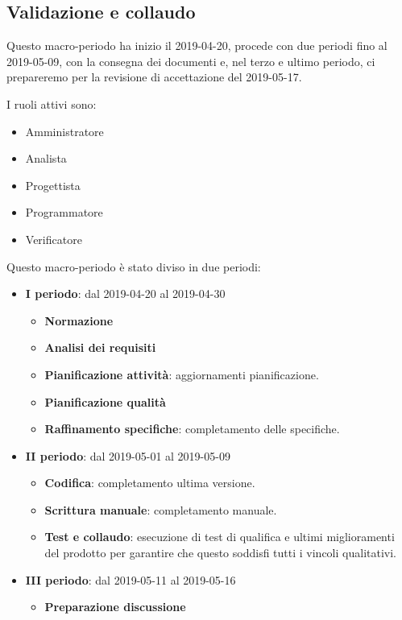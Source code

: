         \subsection{Validazione e collaudo}\label{PianificazineValidazione}
		Questo macro-periodo ha inizio il 2019-04-20, procede con due periodi fino al 2019-05-09, con la consegna dei documenti e, nel terzo e ultimo periodo,
		ci prepareremo per la revisione di accettazione del 2019-05-17.

        I ruoli attivi sono:
        \begin{itemize}
            \item Amministratore
            \item Analista
            \item Progettista
            \item Programmatore
            \item Verificatore
		\end{itemize}

        Questo macro-periodo è stato diviso in due periodi:
		\begin{itemize}
			\item \textbf{I periodo}: dal 2019-04-20 al 2019-04-30
			\begin{itemize}
    	        \item \textbf{Normazione}
    	        \item \textbf{Analisi dei requisiti}
    	        \item \textbf{Pianificazione attività}: aggiornamenti pianificazione.
    	        \item \textbf{Pianificazione qualità}
    	        \item \textbf{Raffinamento specifiche}: completamento delle specifiche.
        	\end{itemize}
			\item \textbf{II periodo}: dal 2019-05-01 al 2019-05-09
			\begin{itemize}
    	        \item \textbf{Codifica}: completamento ultima versione.
    	        \item \textbf{Scrittura manuale}: completamento manuale.
    	        \item \textbf{Test e collaudo}: esecuzione di test di qualifica e ultimi miglioramenti del prodotto per
    	        garantire che questo soddisfi tutti i vincoli qualitativi.
			\end{itemize}
			\item \textbf{III periodo}: dal 2019-05-11 al 2019-05-16
			\begin{itemize}
				\item \textbf{Preparazione discussione}
			\end{itemize}
		\end{itemize}

